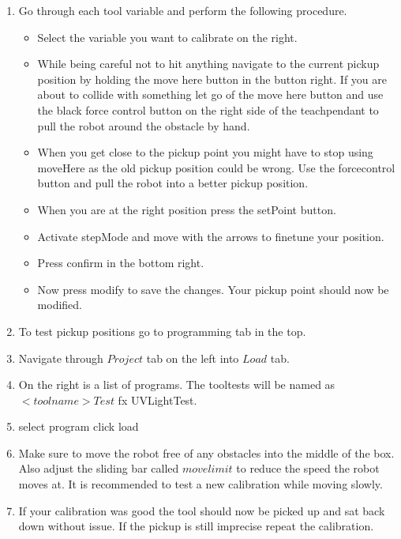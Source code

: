 \documentclass{article}
\begin{document}
\begin{enumerate}
\item Go through each tool variable and perform the following procedure. 
\begin{itemize}
\item Select the variable you want to calibrate on the right.
\item While being careful not to hit anything navigate to the current pickup position by holding the move here button in the button right. If you are about to collide with something let go of the move here button and use the black force control button on the right side of the teachpendant to pull the robot around the obstacle by hand.
\item When you get close to the pickup point you might have to stop using moveHere as the old pickup position could be wrong. Use the forcecontrol button and pull the robot into a better pickup position.
\item When you are at the right position press the setPoint button. 
\item Activate stepMode and move with the arrows to finetune your position.
\item Press confirm in the bottom right. 
\item Now press modify to save the changes. Your pickup point should now be modified. 
\end{itemize}
\item To test pickup positions go to programming tab in the top. 
\item Navigate through $Project$ tab on the left into $Load$ tab. 
\item On the right is a list of programs. The tooltests will be named as $<toolname>Test$ fx UVLightTest. 
\item select program click load
\item Make sure to move the robot free of any obstacles into the middle of the box. Also adjust the sliding bar called $move limit$ to reduce the speed the robot moves at. It is recommended to test a new calibration while moving slowly.
\item If your calibration was good the tool should now be picked up and sat back down without issue. If the pickup is still imprecise repeat the calibration. 
\end{enumerate}
\end{document}
